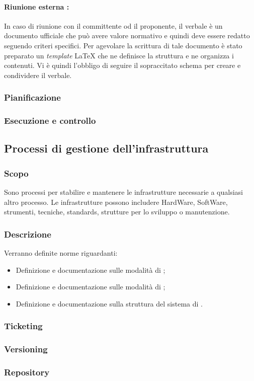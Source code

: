 \documentclass[12pt,a4paper]{article}
\begin{document}
\paragraph{Riunione esterna :}
In caso di riunione con il committente od il proponente, il verbale è un documento ufficiale che può avere valore normativo e quindi deve essere redatto seguendo criteri specifici.
Per agevolare la scrittura di tale documento è stato preparato un \emph{template} \LaTeX{} che ne definisce la struttura e ne organizza i contenuti. Vi è quindi l’obbligo di seguire il sopraccitato schema per creare e condividere il verbale.
\subsubsection{Pianificazione} %

\subsubsection{Esecuzione e controllo} %

\newpage

\subsection{Processi di gestione dell'infrastruttura} %
\subsubsection{Scopo} 
Sono processi per stabilire e mantenere le infrastrutture necessarie a qualsiasi altro processo. Le infrastrutture  possono includere HardWare, SoftWare, strumenti, tecniche, standards, strutture per lo sviluppo o manutenzione.

\subsubsection{Descrizione} 
Verranno definite norme riguardanti:
\begin{itemize}
  \item Definizione e documentazione sulle modalità di \textit{} ;
  \item Definizione e documentazione sulle modalità di \textit{};
  \item Definizione e documentazione sulla struttura del sistema di \textit{}.
\end{itemize}

\subsubsection{Ticketing} 
\subsubsection{Versioning} %
\subsubsection{Repository} %

\newpage
\end{document}
